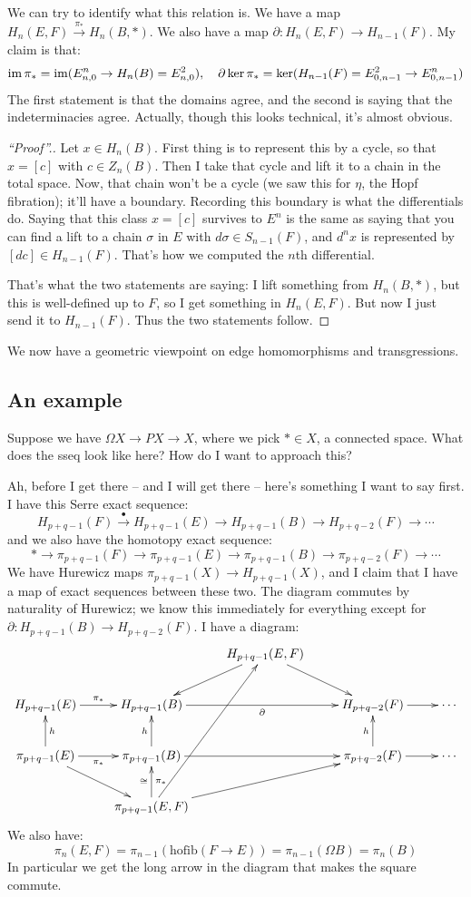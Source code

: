 We can try to identify what this relation is.
We have a map $H_n(E,F)\xrightarrow{\pi_\ast} H_n(B,\ast)$.
We also have a map $\partial : H_n(E,F) \to H_{n-1}(F)$.
My claim is that:
$$
\operatorname{im} \pi_\ast = \operatorname{im}(E^n_{n,0}\to H_n(B) = E^2_{n,0}),\quad \partial\ker\pi_\ast = \ker(H_{n-1}(F) = E^2_{0,n-1} \to E^n_{0,n-1})
$$
The first statement is that the domains agree, and the second is saying that the indeterminacies agree.
Actually, though this looks technical, it's almost obvious.
\begin{proof}[``Proof''.]
    Let $x\in H_n(B)$.
    First thing is to represent this by a cycle, so that $x = [c]$ with $c\in Z_n(B)$.
    Then I take that cycle and lift it to a chain in the total space.
    Now, that chain won't be a cycle (we saw this for $\eta$, the Hopf fibration); it'll have a boundary.
    Recording this boundary is what the differentials do.
    Saying that this class $x = [c]$ survives to $E^n$ is the same as saying that you can find a lift to a chain $\sigma$ in $E$ with $d\sigma\in S_{n-1}(F)$, and $d^n x$ is represented by $[dc]\in H_{n-1}(F)$.
    That's how we computed the $n$th differential.

    That's what the two statements are saying: I lift something from $H_n(B,\ast)$, but this is well-defined up to $F$, so I get something in $H_n(E,F)$.
    But now I just send it to $H_{n-1}(F)$.
    Thus the two statements follow.
\end{proof}
We now have a geometric viewpoint on edge homomorphisms and transgressions.
\subsection{An example}
Suppose we have $\Omega X\to PX \to X$, where we pick $\ast\in X$, a connected space.
What does the sseq look like here?
How do I want to approach this?

Ah, before I get there -- and I will get there -- here's something I want to say first.
I have this Serre exact sequence:
$$
H_{p+q-1}(F)\xrightarrow{\bullet} H_{p+q-1}(E)\to H_{p+q-1}(B)\to H_{p+q-2}(F)\to\cdots
$$
and we also have the homotopy exact sequence:
$$
\ast\to \pi_{p+q-1}(F)\to \pi_{p+q-1}(E)\to \pi_{p+q-1}(B)\to \pi_{p+q-2}(F)\to \cdots
$$
We have Hurewicz maps $\pi_{p+q-1}(X)\to H_{p+q-1}(X)$, and I claim that I have a map of exact sequences between these two.
The diagram commutes by naturality of Hurewicz; we know this immediately for everything except for $\partial : H_{p+q-1}(B)\to H_{p+q-2}(F)$.
I have a diagram:
\begin{equation*}
    \xymatrix{
	& & H_{p+q-1}(E,F)\ar[dl]\ar[dr] & &\\
	H_{p+q-1}(E) \ar[r]^{\pi_\ast} & H_{p+q-1}(B)\ar[rr]_\partial & & H_{p+q-2}(F)\ar[r] & \cdots\\
	\pi_{p+q-1}(E)\ar[r]_{\pi_\ast}\ar[dr]\ar[u]_{h} & \pi_{p+q-1}(B)\ar[u]^h\ar[rr] & & \pi_{p+q-2}(F)\ar[r]\ar[u]^h & \cdots\\
	& \pi_{p+q-1}(E,F)\ar[uuur]\ar[urr]\ar[u]^\cong_{\pi_\ast} & &
    }
\end{equation*}
We also have:
$$
\pi_n(E,F) = \pi_{n-1}(\mathrm{hofib}(F\to E)) = \pi_{n-1}(\Omega B) = \pi_n(B)
$$
In particular we get the long arrow in the diagram that makes the square commute.

